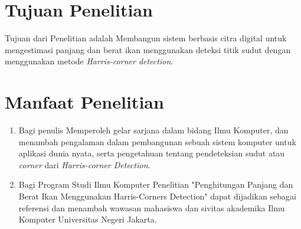 \section{Tujuan Penelitian}
	Tujuan dari Penelitian adalah Membangun sistem berbasis citra digital untuk mengestimasi panjang dan berat ikan menggunakan deteksi titik sudut dengan menggunakan metode \emph{Harris-corner detection}. 

\section{Manfaat Penelitian}
\begin{enumerate}
	\item Bagi penulis
	 Memperoleh gelar sarjana dalam bidang Ilmu Komputer, dan menambah pengalaman dalam pembangunan sebuah sistem komputer untuk aplikasi dunia nyata, serta pengetahuan tentang pendeteksian sudut atau \emph{corner} dari \emph{Harris-corner Detection}. 

		
	\item Bagi Program Studi Ilmu Komputer
	Penelitian "Penghitungan Panjang dan Berat Ikan Menggunakan Harris-Corners Detection" dapat dijadikan sebagai referensi dan menambah wawasan mahasiswa dan sivitas akademika Ilmu Komputer Universitas Negeri Jakarta.

\end{enumerate}

\begin{comment}

\end{comment}

